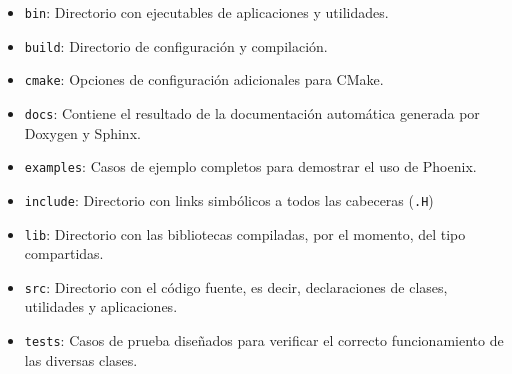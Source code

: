 \begin{itemize}
	\item \texttt{bin}: Directorio con ejecutables de aplicaciones y utilidades.
	\item \texttt{build}: Directorio de configuraci\'on y compilaci\'on.
	\item \texttt{cmake}: Opciones de configuraci\'on adicionales para CMake.
	\item \texttt{docs}: Contiene el resultado de la documentaci\'on autom\'atica generada por Doxygen y Sphinx.
	\item \texttt{examples}: Casos de ejemplo completos para demostrar el uso de Phoenix.
	\item \texttt{include}: Directorio con links simb\'olicos a todos las cabeceras (\texttt{.H})
	\item \texttt{lib}: Directorio con las bibliotecas compiladas, por el momento, del tipo compartidas.
	\item \texttt{src}: Directorio con el c\'odigo fuente, es decir, declaraciones de clases, utilidades y aplicaciones.
	\item \texttt{tests}: Casos de prueba dise\~nados para verificar el correcto funcionamiento de las diversas clases.
	
\end{itemize}

